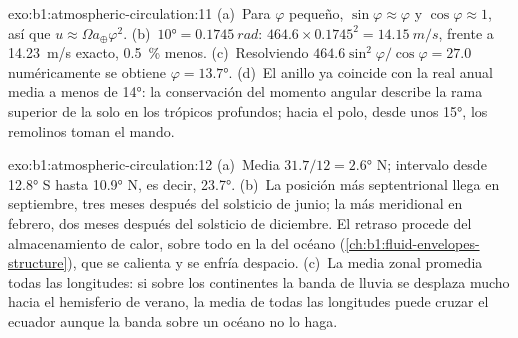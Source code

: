 \begin{solution}{exo:b1:atmospheric-circulation:11}
(a)~Para $\varphi$ pequeño, $\sin\varphi \approx \varphi$ y $\cos\varphi \approx 1$,
así que $u \approx \Omega a_\oplus\varphi^2$. (b)~$\ang{10} = \qty{0.1745}{rad}$:
$464.6 \times 0.1745^2 = \qty{14.15}{m/s}$, frente a \qty{14.23}{m/s} exacto,
\qty{0.5}{\percent} menos. (c)~Resolviendo $464.6\sin^2\varphi/\cos\varphi = 27.0$
numéricamente se obtiene $\varphi = \ang{13.7}$. (d)~El anillo ya coincide con la  real anual media a menos de \ang{14}: la conservación del momento angular describe la rama superior de la  solo en los trópicos profundos; hacia el polo, desde unos \ang{15}, los remolinos toman el mando.
\end{solution}

\begin{solution}{exo:b1:atmospheric-circulation:12}
(a)~Media $31.7/12 = \ang{2.6}$ N; intervalo desde \ang{12.8} S hasta \ang{10.9} N, es decir,
\ang{23.7}. (b)~La posición más septentrional llega en septiembre, tres meses después del solsticio de junio; la más meridional en febrero, dos meses después del solsticio de diciembre. El retraso procede del almacenamiento de calor, sobre todo en la  del océano (\cref{ch:b1:fluid-envelopes-structure}), que se calienta y se enfría despacio. (c)~La media zonal promedia todas las longitudes: si sobre los continentes la banda de lluvia se desplaza mucho hacia el hemisferio de verano, la media de todas las longitudes puede cruzar el ecuador aunque la banda sobre un océano no lo haga.
\end{solution}

